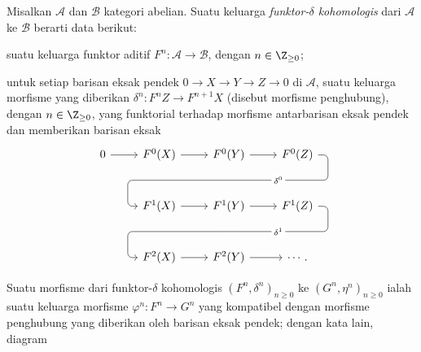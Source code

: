 \begin{definisi}\label{def:delta-functor}
	Misalkan $\mathcal{A}$ dan $\mathcal{B}$ kategori abelian. Suatu keluarga \emph{funktor-$\delta$ kohomologis} dari $\mathcal{A}$ ke $\mathcal{B}$ berarti data berikut:
	\begin{compactitem}
		\item suatu keluarga funktor aditif $F^n: \mathcal{A} \to \mathcal{B}$, dengan $n \in \Z_{\geq 0}$;
		\item untuk setiap barisan eksak pendek $0 \to X \to Y \to Z \to 0$ di $\mathcal{A}$, suatu keluarga morfisme yang diberikan $\delta^n: F^n Z \to F^{n+1} X$ (disebut morfisme penghubung), dengan $n \in \Z_{\geq 0}$, yang funktorial terhadap morfisme antarbarisan eksak pendek dan memberikan barisan eksak
		\begin{equation*}\begin{tikzcd}[row sep=large]
			0 \arrow[r] & F^0(X) \arrow[r] & F^0(Y) \arrow[r] \arrow[phantom, d, ""{coordinate, name=A}] & F^0(Z) \arrow[dll, rounded corners, "{\delta^0}" description, to path={
				-- ([xshift=2ex]\tikztostart.east)
				|- (A) [near end]\tikztonodes
				-| ([xshift=-2ex]\tikztotarget.west)
				-- (\tikztotarget)}] \\
			& F^1(X) \arrow[r] & F^1(Y) \arrow[r] \arrow[phantom, d, ""{coordinate, name=B}] & F^1(Z) \arrow[dll, rounded corners, "{\delta^1}" description, to path={
				-- ([xshift=2ex]\tikztostart.east)
				|- (B) [near end]\tikztonodes
				-| ([xshift=-2ex]\tikztotarget.west)
				-- (\tikztotarget)}] \\
			& F^2(X) \arrow[r] & F^2(Y) \arrow[r] & \cdots .
		\end{tikzcd}\end{equation*}
	\end{compactitem}
	Suatu morfisme dari funktor-$\delta$ kohomologis $(F^n, \delta^n)_{n \geq 0}$ ke $(G^n, \eta^n)_{n \geq 0}$ ialah suatu keluarga morfisme $\varphi^n: F^n \to G^n$ yang kompatibel dengan morfisme penghubung yang diberikan oleh barisan eksak pendek; dengan kata lain, diagram
	\[\begin{tikzcd}

\end{tikzcd}\]
\end{definisi}
